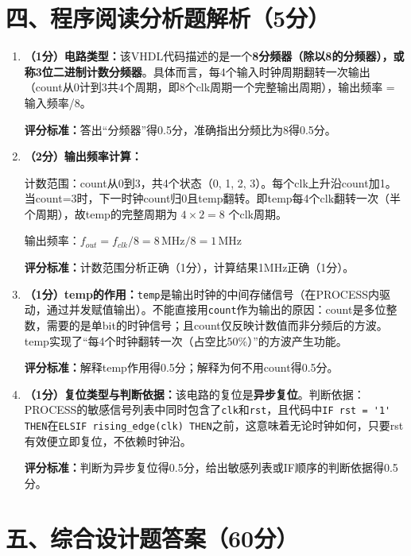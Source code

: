 \section{四、程序阅读分析题解析（5分）}

\begin{enumerate}[label=(\arabic*), leftmargin=*]

\item \textbf{（1分）电路类型：}该VHDL代码描述的是一个\textbf{8分频器（除以8的分频器），或称3位二进制计数分频器}。具体而言，每4个输入时钟周期翻转一次输出（count从0计到3共4个周期，即8个clk周期一个完整输出周期），输出频率 = 输入频率/8。

\textbf{评分标准：}答出“分频器”得0.5分，准确指出分频比为8得0.5分。

\item \textbf{（2分）输出频率计算：}

计数范围：count从0到3，共4个状态（0, 1, 2, 3）。每个clk上升沿count加1。当count=3时，下一时钟count归0且temp翻转。即temp每4个clk翻转一次（半个周期），故temp的完整周期为 $4 \times 2 = 8$ 个clk周期。

输出频率：$f_{out} = f_{clk} / 8 = 8\,\text{MHz} / 8 = 1\,\text{MHz}$

\textbf{评分标准：}计数范围分析正确（1分），计算结果1MHz正确（1分）。

\item \textbf{（1分）temp的作用：}\verb|temp|是输出时钟的中间存储信号（在PROCESS内驱动，通过并发赋值输出）。不能直接用\verb|count|作为输出的原因：count是多位整数，需要的是单bit的时钟信号；且count仅反映计数值而非分频后的方波。temp实现了“每4个时钟翻转一次（占空比50\%）”的方波产生功能。

\textbf{评分标准：}解释temp作用得0.5分；解释为何不用count得0.5分。

\item \textbf{（1分）复位类型与判断依据：}该电路的复位是\textbf{异步复位}。判断依据：PROCESS的敏感信号列表中同时包含了\verb|clk|和\verb|rst|，且代码中\verb|IF rst = '1' THEN|在\verb|ELSIF rising_edge(clk) THEN|之前，这意味着无论时钟如何，只要rst有效便立即复位，不依赖时钟沿。

\textbf{评分标准：}判断为异步复位得0.5分，给出敏感列表或IF顺序的判断依据得0.5分。

\end{enumerate}

\section{五、综合设计题答案（60分）}

